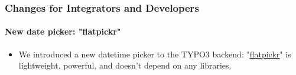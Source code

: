 %

\begin{frame}[fragile]
	\frametitle{Changes for Integrators and Developers}
	\framesubtitle{New date picker: "flatpickr"}

	\lstset{basicstyle=\tiny\ttfamily}

	\begin{itemize}
		\item We introduced a new datetime picker to the TYPO3 backend:\newline
			"\href{https://flatpickr.js.org/}{flatpickr}"
			is lightweight, powerful, and doesn't depend on any libraries.

	\end{itemize}

\end{frame}

